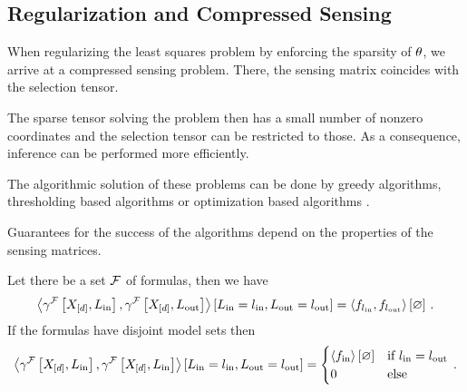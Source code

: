 

\subsection{Regularization and Compressed Sensing}


When regularizing the least squares problem by enforcing the sparsity of $\theta$, we arrive at a compressed sensing problem.
There, the sensing matrix coincides with the selection tensor.

The sparse tensor solving the problem then has a small number of nonzero coordinates and the selection tensor can be restricted to those.
As a consequence, inference can be performed more efficiently.

The algorithmic solution of these problems can be done by greedy algorithms, thresholding based algorithms or optimization based algorithms \cite{foucart_mathematical_2013}.

Guarantees for the success of the algorithms depend on the properties of the sensing matrices.

\begin{example}
	Let there be a set $\mathcal{F}$ of formulas, then we have
	\begin{align*}
		\left\langle \gamma^{\mathcal{F}}\left[X_{[d]},L_{\mathrm{in}}\right],\gamma^{\mathcal{F}}\left[X_{[d]},L_{\mathrm{out}}\right]\right\rangle \left[ L_{\mathrm{in}}=l_{\mathrm{in}},L_{\mathrm{out}}=l_{\mathrm{out}} \right]
		= \left\langle f_{l_{\mathrm{in}}}, f_{l_{\mathrm{out}}}\right\rangle \left[ \varnothing \right] \, . 
	\end{align*}
	If the formulas have disjoint model sets then 
	\begin{align*}
		\left\langle \gamma^{\mathcal{F}}\left[X_{[d]},L_{\mathrm{in}}\right],\gamma^{\mathcal{F}}\left[X_{[d]},L_{\mathrm{in}}\right]\right\rangle \left[ L_{\mathrm{in}}=l_{\mathrm{in}},L_{\mathrm{out}}=l_{\mathrm{out}} \right]
		= \begin{cases}
			\left\langle f_{\mathrm{in}}\right\rangle \left[ \varnothing \right] & \text{if } l_{\mathrm{in}}=l_{\mathrm{out}} \\
			0 & \text{else} 
		\end{cases} \, . 
	\end{align*}
\end{example}



